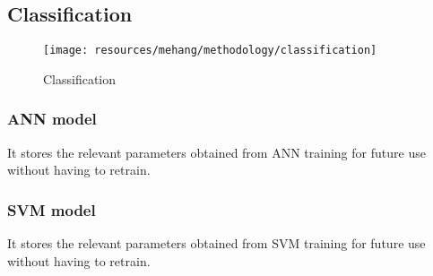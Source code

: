 \subsection{Classification}
\begin{figure}[h!]
        \centering
        \texttt{[image: resources/mehang/methodology/classification]}
        \caption{Classification}
\end{figure}
\subsubsection{ANN model}
It stores the relevant parameters obtained from ANN training for future use without having to retrain.
\subsubsection{SVM model}
It stores the relevant parameters obtained from SVM training for future use without having to retrain.

